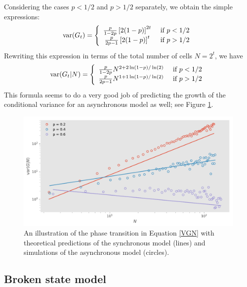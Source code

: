 \documentclass{article}
\begin{document}
Considering the cases $p<1/2$ and $p>1/2$ separately, we obtain the simple expressions:  
\begin{equation}
{\rm var}(G_t) = \left\{\begin{array}{cc} 
\frac{p}{1-2p} \left[2(1-p)\right]^{2t}& \text{ if } p<1/2\\
\frac{p}{2p-1} \left[2(1-p)\right]^{t}& \text{ if } p>1/2
\end{array}\right.
\end{equation}
Rewriting this expression in terms of the total number of cells $N = 2^t$, we have
\begin{equation}\label{VGN}
{\rm var}(G_t|N) = \left\{\begin{array}{cc} 
\frac{p}{1-2p} N^{2 + 2 \ln(1-p)/\ln(2)}& \text{ if } p<1/2\\
\frac{p}{2p-1} N^{1+ 1 \ln(1-p)/\ln(2)}& \text{ if } p>1/2
\end{array}\right.
\end{equation}
This formula seems to do a very good job of predicting the growth of the conditional variance for an asynchronous model as well; see Figure \ref{fig:S1}. 


\begin{figure}[h!]
\centering
\includegraphics[scale=0.6]{figS1.pdf}
\caption{An illustration of the phase transition in Equation \ref{VGN} with theoretical predictions of the synchronous model  (lines) and simulations of the asynchronous model (circles). }\label{fig:S1}
\end{figure}



\subsection{Broken state model}
\end{document}
